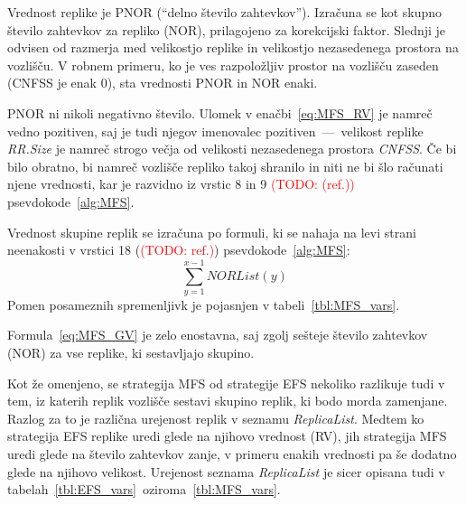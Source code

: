 \documentclass[a4paper, 12pt]{book}
\newcommand{\TODO}[1]{\textcolor{red}{(TODO: #1)}}
\begin{document}
Vrednost replike je PNOR (``delno število zahtevkov''). Izračuna
se kot skupno število zahtevkov za repliko (NOR), prilagojeno za
korekcijski faktor. Slednji je odvisen od razmerja med velikostjo replike
in velikostjo nezasedenega prostora na vozlišču. V robnem primeru,
ko je ves razpoložljiv prostor na vozlišču zaseden (CNFSS je enak 0), sta
vrednosti PNOR in NOR enaki.

PNOR ni nikoli negativno število. Ulomek v enačbi~\eqref{eq:MFS_RV} je namreč
vedno pozitiven, saj je tudi njegov imenovalec pozitiven~---~velikost replike
\textit{RR.Size} je namreč strogo večja od velikosti nezasedenega prostora
\textit{CNFSS}. Če bi bilo obratno, bi namreč vozlišče repliko takoj shranilo
in niti ne bi šlo računati njene vrednosti, kar je razvidno iz vrstic 8 in 9
\TODO{(ref.)} psevdokode~\ref{alg:MFS}.

\begin{samepage}
Vrednost skupine replik se izračuna po formuli, ki se nahaja na levi strani
neenakosti v vrstici 18 (\TODO{ref.}) psevdokode~\ref{alg:MFS}:
\begin{equation}
	\sum\limits_{y=1}^{x-1} \mathit{NORList(y)}
  \label{eq:MFS_GV}
\end{equation}
Pomen posameznih spremenljivk je pojasnjen v tabeli~\ref{tbl:MFS_vars}.
\end{samepage}
\vspace{1em}

Formula~\eqref{eq:MFS_GV} je zelo enostavna, saj zgolj sešteje število
zahtevkov (NOR) za vse replike, ki sestavljajo skupino.

Kot že omenjeno, se strategija MFS od strategije EFS nekoliko razlikuje
tudi v tem, iz katerih replik vozlišče sestavi skupino replik, ki bodo morda
zamenjane. Razlog za to je različna urejenost replik v seznamu
\textit{ReplicaList}. Medtem ko strategija EFS replike uredi glede na
njihovo vrednost (RV), jih strategija MFS uredi glede na
število zahtevkov zanje, v primeru enakih vrednosti pa še dodatno
glede na njihovo velikost. Urejenost seznama \textit{ReplicaList} je
sicer opisana tudi v tabelah~\ref{tbl:EFS_vars}~oziroma~\ref{tbl:MFS_vars}.
\end{document}
